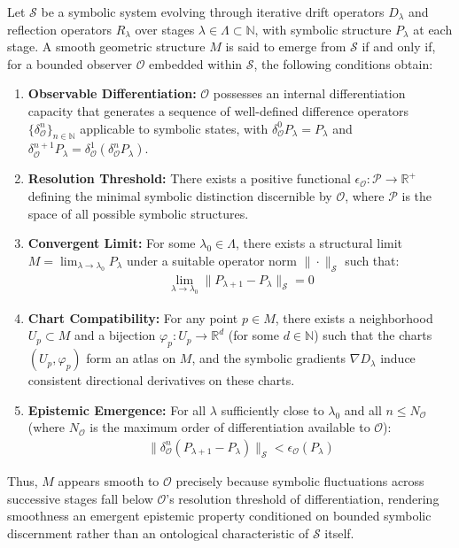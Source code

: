 \begin{axiom}
\label{axiom:bk1_symbolic_smoothness}
Let $\mathcal{S}$ be a symbolic system evolving through iterative drift operators $D_\lambda$ and reflection operators $R_\lambda$ over stages $\lambda \in \Lambda \subset \mathbb{N}$, with symbolic structure $P_\lambda$ at each stage. A smooth geometric structure $M$ is said to emerge from $\mathcal{S}$ if and only if, for a bounded observer $\mathcal{O}$ embedded within $\mathcal{S}$, the following conditions obtain:
\begin{enumerate}
    \item \textbf{Observable Differentiation:} $\mathcal{O}$ possesses an internal differentiation capacity that generates a sequence of well-defined difference operators $\{\delta^n_{\mathcal{O}}\}_{n \in \mathbb{N}}$ applicable to symbolic states, with $\delta^0_{\mathcal{O}}P_\lambda = P_\lambda$ and $\delta^{n+1}_{\mathcal{O}}P_\lambda = \delta^1_{\mathcal{O}}(\delta^n_{\mathcal{O}}P_\lambda)$.
    \item \textbf{Resolution Threshold:} There exists a positive functional $\epsilon_{\mathcal{O}}: \mathcal{P} \rightarrow \mathbb{R}^+$ defining the minimal symbolic distinction discernible by $\mathcal{O}$, where $\mathcal{P}$ is the space of all possible symbolic structures.
    \item \textbf{Convergent Limit:} For some $\lambda_0 \in \Lambda$, there exists a structural limit $M = \lim_{\lambda \to \lambda_0} P_\lambda$ under a suitable operator norm $\|\cdot\|_{\mathcal{S}}$ such that:
        \begin{align}
        \lim_{\lambda \to \lambda_0} \|P_{\lambda+1} - P_\lambda\|_{\mathcal{S}} = 0
        \end{align}
    \item \textbf{Chart Compatibility:} For any point $p \in M$, there exists a neighborhood $U_p \subset M$ and a bijection $\varphi_p: U_p \rightarrow \mathbb{R}^d$ (for some $d \in \mathbb{N}$) such that the charts $(U_p, \varphi_p)$ form an atlas on $M$, and the symbolic gradients $\nabla D_\lambda$ induce consistent directional derivatives on these charts.
    \item \textbf{Epistemic Emergence:} For all $\lambda$ sufficiently close to $\lambda_0$ and all $n \leq N_{\mathcal{O}}$ (where $N_{\mathcal{O}}$ is the maximum order of differentiation available to $\mathcal{O}$):
        \begin{align}
        \|\delta^n_{\mathcal{O}}(P_{\lambda+1} - P_\lambda)\|_{\mathcal{S}} < \epsilon_{\mathcal{O}}(P_\lambda)
        \end{align}
\end{enumerate}
Thus, $M$ appears smooth to $\mathcal{O}$ precisely because symbolic fluctuations across successive stages fall below $\mathcal{O}$'s resolution threshold of differentiation, rendering smoothness an emergent epistemic property conditioned on bounded symbolic discernment rather than an ontological characteristic of $\mathcal{S}$ itself.
\end{axiom}
